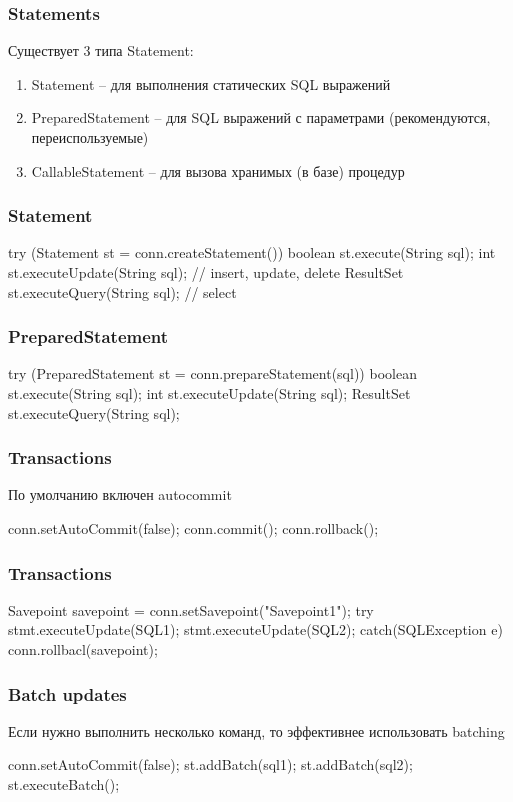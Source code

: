 \documentclass[russian,aspectratio=169,14pt]{beamer}
\begin{document}
\begin{frame}
	\frametitle{Statements}
	Существует 3 типа Statement:
	\vfill
	\begin{enumerate}
		\item Statement -- для выполнения статических SQL выражений
		\item PreparedStatement -- для SQL выражений с параметрами (рекомендуются, переиспользуемые)
		\item CallableStatement -- для вызова хранимых (в базе) процедур
	\end{enumerate}
\end{frame}

\begin{frame}[fragile]
	\frametitle{Statement}
	\begin{listjava}
try (Statement st = conn.createStatement()) {
	boolean st.execute(String sql);
	int st.executeUpdate(String sql); // insert, update, delete
	ResultSet st.executeQuery(String sql); // select
}
	\end{listjava}
\end{frame}

\begin{frame}[fragile]
	\frametitle{PreparedStatement}
	\begin{listjava}
try (PreparedStatement st = conn.prepareStatement(sql)) {
	boolean st.execute(String sql);
	int st.executeUpdate(String sql);
	ResultSet st.executeQuery(String sql);
}
	\end{listjava}
\end{frame}

\begin{frame}[fragile]
	\frametitle{Transactions}
	По умолчанию включен autocommit
	\vfill
	\begin{listjava}
conn.setAutoCommit(false);
conn.commit();
conn.rollback();
	\end{listjava}
\end{frame}

\begin{frame}[fragile]
	\frametitle{Transactions}
	\begin{listjava}
Savepoint savepoint = conn.setSavepoint("Savepoint1");
try {
    stmt.executeUpdate(SQL1);
    stmt.executeUpdate(SQL2);
} catch(SQLException e) {
	conn.rollbacl(savepoint);
}
	\end{listjava}
\end{frame}

\begin{frame}[fragile]
	\frametitle{Batch updates}
	Если нужно выполнить несколько команд, то эффективнее использовать batching
	\begin{listjava}
conn.setAutoCommit(false);
st.addBatch(sql1);
st.addBatch(sql2);
st.executeBatch();
	\end{listjava}
\end{frame}
\end{document}
